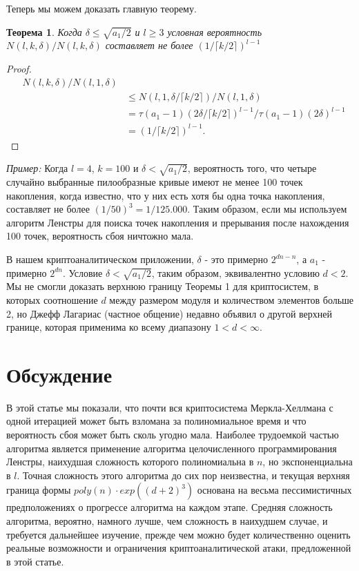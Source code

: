 \documentclass[a4paper,12pt]{report}
\newtheorem{Теорема}{Теорема}
\begin{document}
Теперь мы можем доказать главную теорему.

\begin{Теорема}
Когда $\delta \leq \sqrt{a_1 / 2}$ и $l \geq 3$ \textit{условная вероятность} $N(l,k,\delta)/N(l,k,\delta)$ составляет не более $(1 / \lceil k / 2 \rceil)^{l - 1}$
\end{Теорема}

\begin{proof}

\begin{eqnarray*}
&N(l, k, \delta) / N(l, 1, \delta) \\
&&\leq N(l,1,\delta / \lceil k / 2 \rceil) / N(l,1,\delta) \\
&&= \tau(a_1 - 1)(2\delta / \lceil k / 2 \rceil)^{l - 1} / \tau(a_1 - 1)(2\delta)^{l - 1} \\
&&= (1 / \lceil k / 2 \rceil)^{l - 1}.
\end{eqnarray*}
\end{proof}

\textit{Пример:} Когда $l= 4$, $k = 100$ и $\delta < \sqrt{a_1/2}$, вероятность того, что четыре случайно выбранные пилообразные кривые имеют не менее 100 точек накопления, когда известно, что у них есть хотя бы одна точка накопления, составляет не более $(1 / 50)^{3} = 1 / 125.000$. Таким образом, если мы используем алгоритм Ленстры для поиска точек накопления и прерывания после нахождения 100 точек, вероятность сбоя ничтожно мала.

В нашем криптоаналитическом приложении, $\delta$ - это примерно $2^{dn - n}$, а $a_1$ - примерно $2^{dn}$. Условие $\delta < \sqrt{a_1 / 2}$, таким образом, эквивалентно условию $d < 2$. Мы не смогли доказать верхнюю границу Теоремы 1 для криптосистем, в которых соотношение $d$ между размером модуля и количеством элементов больше 2, но Джефф Лагариас (частное общение) недавно объявил о другой верхней границе, которая применима ко всему диапазону $1 < d < \infty$.

\chapter{Обсуждение}\label{ch::discussion}

В этой статье мы показали, что почти вся криптосистема Меркла-Хеллмана с одной итерацией может быть взломана за полиномиальное время и что вероятность сбоя может быть сколь угодно мала. Наиболее трудоемкой частью алгоритма является применение алгоритма целочисленного программирования Ленстры, наихудшая сложность которого полиномиальна в $n$, но экспоненциальна в $l$. Точная сложность этого алгоритма до сих пор неизвестна, и текущая верхняя граница формы $poly(n) \cdot exp((d + 2)^{3})$ основана на весьма пессимистичных предположениях о прогрессе алгоритма на каждом этапе. Средняя сложность алгоритма, вероятно, намного лучше, чем сложность в наихудшем случае, и требуется дальнейшее изучение, прежде чем можно будет количественно оценить реальные возможности и ограничения криптоаналитической атаки, предложенной в этой статье.
\end{document}
